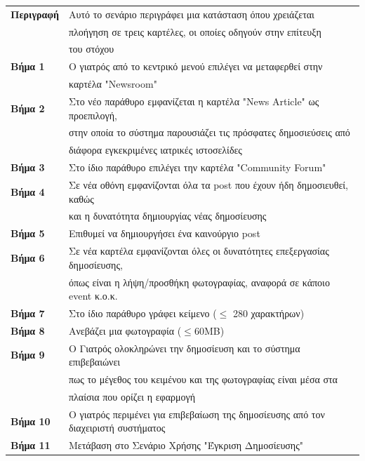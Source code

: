 \documentclass{article}
\newcommand\T{\rule{0pt}{2.6ex}}       %
\newcommand\B{\rule[-1.2ex]{0pt}{0pt}}
\begin{document}
 \begin{center}
     \begin{tabular}{|l|l|}
     \hline
      \textbf{Περιγραφή} & Αυτό το σενάριο περιγράφει μια κατάσταση όπου χρειάζεται \T \\& πλοήγηση σε τρεις καρτέλες, οι οποίες οδηγούν στην επίτευξη \\& του στόχου \B \\ 
      \hline
      \textbf{Βήμα 1} & Ο γιατρός από το κεντρικό μενού επιλέγει να μεταφερθεί στην \T \\& καρτέλα "Newsroom" \T\B \\
      \hline
      \textbf{Βήμα 2} & Στο νέο παράθυρο εμφανίζεται η καρτέλα "News Article" ως προεπιλογή, \T \\& στην οποία το σύστημα παρουσιάζει τις πρόσφατες δημοσιεύσεις από \\& διάφορα εγκεκριμένες ιατρικές ιστοσελίδες \B \\
      \hline
      \textbf{Βήμα 3} & Στο ίδιο παράθυρο επιλέγει την καρτέλα "Community Forum" \T\B \\
      \hline
      \textbf{Βήμα 4} & Σε νέα οθόνη εμφανίζονται όλα τα post που έχουν ήδη δημοσιευθεί, καθώς \T \\& και η δυνατότητα δημιουργίας νέας δημοσίευσης \B \\
      \hline
      \textbf{Βήμα 5} & Επιθυμεί να δημιουργήσει ένα καινούργιο post \T\B \\
      \hline
      \textbf{Βήμα 6} & Σε νέα καρτέλα εμφανίζονται όλες οι δυνατότητες επεξεργασίας δημοσίευσης,\T \\& όπως είναι η λήψη/προσθήκη φωτογραφίας, αναφορά σε κάποιο event κ.ο.κ. \B \\
      \hline
      \textbf{Βήμα 7} & Στο ίδιο παράθυρο γράφει κείμενο ($\le$ 280 χαρακτήρων) \T\B \\
      \hline
      \textbf{Βήμα 8} & Ανεβάζει μια φωτογραφία ($\le$60MB) \T\B \\
      \hline
      \textbf{Βήμα 9} & Ο Γιατρός ολοκληρώνει την δημοσίευση και το σύστημα επιβεβαιώνει \T \\& πως το μέγεθος του κειμένου και της φωτογραφίας είναι μέσα στα \\& πλαίσια που ορίζει η εφαρμογή \B \\
      \hline      
      \textbf{Βήμα 10} & Ο γιατρός περιμένει για επιβεβαίωση της δημοσίευσης από τον διαχειριστή συστήματος \T\B \\
      \hline
       \textbf{Βήμα 11} & Μετάβαση στο Σενάριο Χρήσης "Έγκριση Δημοσίευσης"\T\B \\
      \hline
     \end{tabular}
 \end{center}
 
\end{document}

